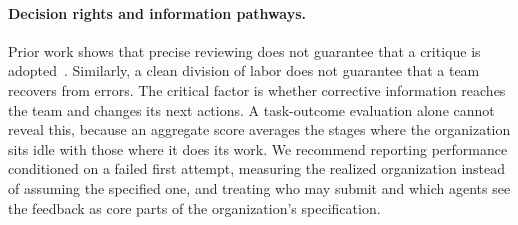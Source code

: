 \paragraph{Decision rights and information pathways.} Prior work shows that
precise reviewing does not guarantee that a critique is
adopted~\cite{yang2026precise}. Similarly, a clean division of labor does
not guarantee that a team recovers from errors. The critical factor is
whether corrective information reaches the team and changes its next
actions. A task-outcome evaluation alone cannot reveal this, because an
aggregate score averages the stages where the organization sits idle with
those where it does its work. We recommend reporting performance
conditioned on a failed first attempt, measuring the realized organization
instead of assuming the specified one, and treating who may submit and
which agents see the feedback as core parts of the organization's
specification.
